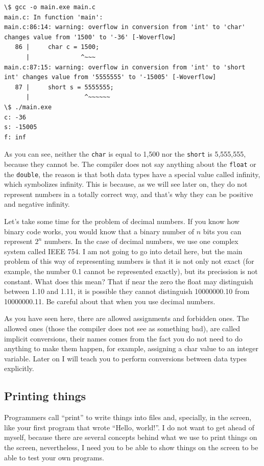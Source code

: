 \documentclass[a4paper]{article}
\begin{document}
\noindent
\begin{minipage}[H]{\linewidth}
\mbox{}
\begin{lstlisting}[style=terminalStyle]
\$ gcc -o main.exe main.c
main.c: In function 'main':
main.c:86:14: warning: overflow in conversion from 'int' to 'char' changes value from '1500' to '-36' [-Woverflow]
   86 |     char c = 1500;
      |              ^~~~
main.c:87:15: warning: overflow in conversion from 'int' to 'short int' changes value from '5555555' to '-15005' [-Woverflow]
   87 |     short s = 5555555;
      |               ^~~~~~~
\$ ./main.exe
c: -36
s: -15005
f: inf
\end{lstlisting}
\end{minipage}

As you can see, neither the \texttt{char} is equal to 1,500 nor the
\texttt{short} is 5,555,555, because they cannot be. The compiler does not say
anything about the \texttt{float} or the \texttt{double}, the reason is that
both data types have a special value called infinity, which symbolizes infinity.
This is because, as we will see later on, they do not represent numbers in a
totally correct way, and that's why they can be positive and negative infinity.

Let's take some time for the problem of decimal numbers. If you know how binary
code works, you would know that a binary number of $n$ bits you can represent
$2^n$ numbers. In the case of decimal numbers, we use one complex system called
IEEE 754. I am not going to go into detail here, but the main problem of this
way of representing numbers is that it is not only not exact (for example,
the number 0.1 cannot be represented exactly), but its precission is not
constant. What does this mean? That if near the zero the float may distinguish
between 1.10 and 1.11, it is possible they cannot distinguish 10000000.10 from
10000000.11. Be careful about that when you use decimal numbers.

As you have seen here, there are allowed assignments and forbidden ones. The
allowed ones (those the compiler does not see as something bad), are called
implicit conversions, their names comes from the fact you do not need to do
anything to make them happen, for example, assigning a char value to an integer
variable. Later on I will teach you to perform conversions between data types
explicitly.

\subsection{Printing things}
Programmers call ``print'' to write things into files and, specially, in the
screen, like your first program that wrote ``Hello, world!''. I do not want to
get ahead of myself, because there are several concepts behind what we use to
print things on the screen, nevertheless, I need you to be able to show things
on the screen to be able to test your own programs.
\end{document}
